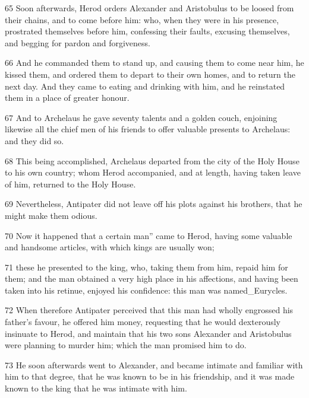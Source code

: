 \par 65 Soon afterwards, Herod orders Alexander and Aristobulus to be loosed from their chains, and to come before him: who, when they were in his presence, prostrated themselves before him, confessing their faults, excusing themselves, and begging for pardon and forgiveness. 

\par 66 And he commanded them to stand up, and causing them to come near him, he kissed them, and ordered them to depart to their own homes, and to return the next day. And they came to eating and drinking with him, and he reinstated them in a place of greater honour. 

\par 67 And to Archelaus he gave seventy talents and a golden couch, enjoining likewise all the chief men of his friends to offer valuable presents to Archelaus: and they did so. 

\par 68 This being accomplished, Archelaus departed from the city of the Holy House to his own country; whom Herod accompanied, and at length, having taken leave of him, returned to the Holy House. 

\par 69 Nevertheless, Antipater did not leave off his plots against his brothers, that he might make them odious. 

\par 70 Now it happened that a certain man” came to Herod, having some valuable and handsome articles, with which kings are usually won; 

\par 71 these he presented to the king, who, taking them from him, repaid him for them; and the man obtained a very high place in his affections, and having been taken into his retinue, enjoyed his confidence: this man was named_Eurycles.

\par 72 When therefore Antipater perceived that this man had wholly engrossed his father’s favour, he offered him money, requesting that he would dexterously insinuate to Herod, and maintain that his two sons Alexander and Aristobulus were planning to murder him; which the man promised him to do. 

\par 73 He soon afterwards went to Alexander, and became intimate and familiar with him to that degree, that he was known to be in his friendship, and it was made known to the king that he was intimate with him. 

